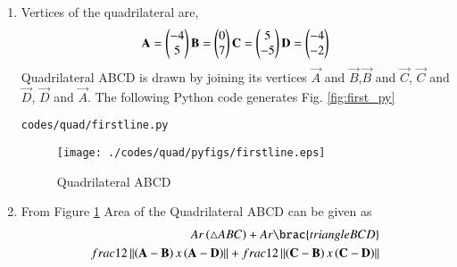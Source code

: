 \renewcommand{\theequation}{\theenumi}
\begin{enumerate}[label=\thesection.\arabic*.,ref=\thesection.\theenumi]

\item Vertices of the quadrilateral are,
\begin{align}
\mathbf{A}=\begin{pmatrix}-4\\5\end{pmatrix}
\mathbf{B}=\begin{pmatrix}0\\7\end{pmatrix}
\mathbf{C}=\begin{pmatrix}5\\-5\end{pmatrix}
\mathbf{D}=\begin{pmatrix}-4\\-2\end{pmatrix}
\end{align}
Quadrilateral ABCD is drawn by joining its vertices $\vec{A}$ and $\vec{B}$,$\vec{B}$ and $\vec{C}$, $\vec{C}$ and $\vec{D}$, $\vec{D}$ and $\vec{A}$.
 The  following Python code generates Fig. \ref{fig:first_py}
%
\begin{lstlisting}
codes/quad/firstline.py
\end{lstlisting}
\begin{figure}[!ht]
\centering
\texttt{[image: ./codes/quad/pyfigs/firstline.eps]}
\caption{Quadrilateral ABCD}
\label{fig:quad_py}
\end{figure}

\item From Figure \ref{fig:quad_py} Area of the Quadrilateral ABCD can be given as
\begin{align}
Ar\brak{\triangle ABC} + Ar\brac{triangle BCD}
\\
frac{1}{2} \norm{\brak{\vec{A}-\vec{B}}x\brak{\vec{A}-\vec{D}}} + frac{1}{2} \norm{\brak{\vec{C}-\vec{B}}x\brak{\vec{C}-\vec{D}}}
\end{align}
\end{enumerate}
